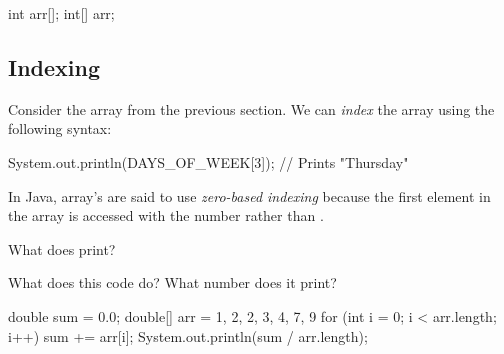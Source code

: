 \begin{code}
int arr[];
int[] arr;
\end{code}

\subsection{Indexing}

Consider the array  from the previous section. We can \emph{index} the array using the following syntax:

\begin{code}
System.out.println(DAYS_OF_WEEK[3]);  // Prints "Thursday"
\end{code}

In Java, array's are said to use \emph{zero-based indexing} because the first element in the array is accessed with the number  rather than .

\begin{example}
What does  print?
\end{example}

\begin{example}
What does this code do? What number does it print?

\begin{code}
double sum = 0.0;
double[] arr = { 1, 2, 2, 3, 4, 7, 9 }
for (int i = 0; i < arr.length; i++) {
    sum += arr[i];
}
System.out.println(sum / arr.length);
\end{code}
\end{example}








